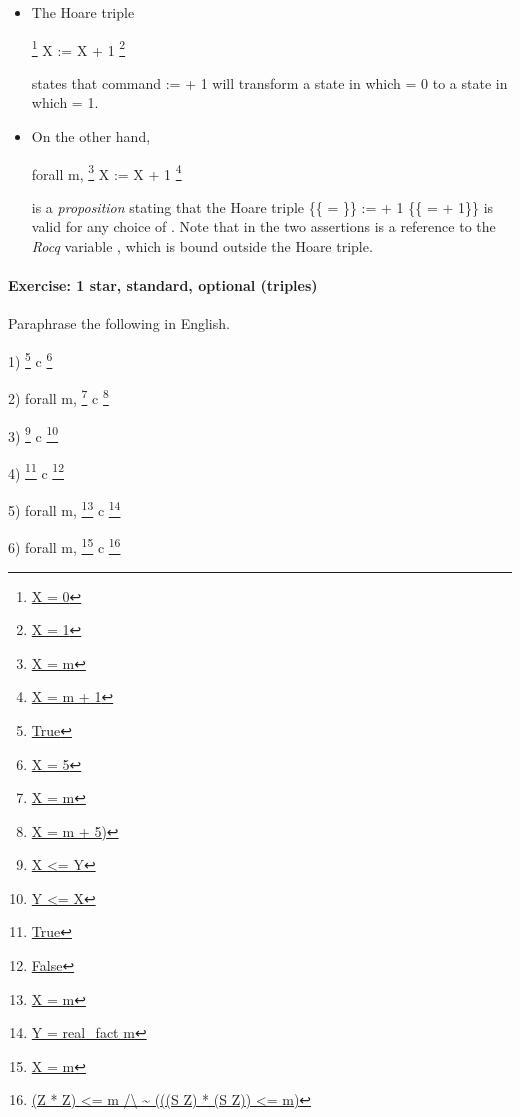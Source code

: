 \documentclass[12pt]{report}
\begin{document}
\begin{itemize}
\item  The Hoare triple


          \footnote{\url{X = 0}} X := X + 1 \footnote{\url{X = 1}}


      states that command  :=  + 1 will transform a state in
      which  = 0 to a state in which  = 1.



\item  On the other hand,


          forall m, \footnote{\url{X = m}} X := X + 1 \footnote{\url{X = m + 1}}


      is a \textit{proposition} stating that the Hoare triple \{\{ = \}\}  :=
       + 1 \{\{ =  + 1\}\} is valid for any choice of .  Note that
       in the two assertions is a reference to the \textit{Rocq} variable
      , which is bound outside the Hoare triple. 
\end{itemize}


\paragraph{Exercise: 1 star, standard, optional (triples)}




    Paraphrase the following in English.


     1) \footnote{\url{True}} c \footnote{\url{X = 5}}


     2) forall m, \footnote{\url{X = m}} c \footnote{\url{X = m + 5)}}


     3) \footnote{\url{X <= Y}} c \footnote{\url{Y <= X}}


     4) \footnote{\url{True}} c \footnote{\url{False}}


     5) forall m,
          \footnote{\url{X = m}}
          c
          \footnote{\url{Y = real_fact m}}


     6) forall m,
          \footnote{\url{X = m}}
          c
          \footnote{\url{(Z * Z) <= m /\ ~ (((S Z) * (S Z)) <= m)}}

\begin{coqdoccode}
\coqdocemptyline
\end{coqdoccode}
\end{document}
